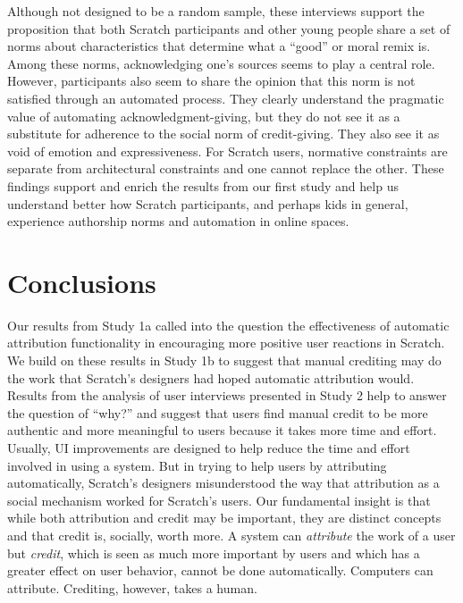 Although not designed to be a random sample, these interviews support
the proposition that both Scratch participants and other young people
share a set of norms about characteristics that determine what a
``good'' or moral remix is. Among these norms, acknowledging one's
sources seems to play a central role. However, participants also seem
to share the opinion that this norm is not satisfied through an
automated process.  They clearly understand the pragmatic value of
automating acknowledgment-giving, but
they do not see it as a substitute for adherence to the social norm of
credit-giving. They also see it as void of emotion and expressiveness.
For Scratch users, normative constraints are separate from
architectural constraints and one cannot replace the other.
These findings support and enrich the results from our first
study and help us understand better how Scratch participants, and
perhaps kids in general, experience authorship norms and automation in
online spaces.

\section{Conclusions}

Our results from Study 1a called into the question the effectiveness
of automatic attribution functionality in encouraging more positive
user reactions in Scratch. We build on these results in Study 1b to
suggest that manual crediting may do the work that Scratch's designers
had hoped automatic attribution would. Results from the analysis of
user interviews presented in Study 2 help to answer the question of
``why?'' and suggest that users find manual credit to be more
authentic and more meaningful to users because it takes more time and
effort. Usually, UI  improvements are designed to help reduce the time
and effort involved in using a system. But in trying to help users by attributing automatically,
Scratch's designers misunderstood the way that attribution as a social
mechanism worked for Scratch's users. Our fundamental insight is that
while both attribution and credit may be important, they are distinct
concepts and that credit is, socially, worth more. A system can
\emph{attribute} the work of a user but \emph{credit}, which is seen
as much more important by users and which has a greater effect on user
behavior, cannot be done automatically. Computers can
attribute. Crediting, however, takes a human.

